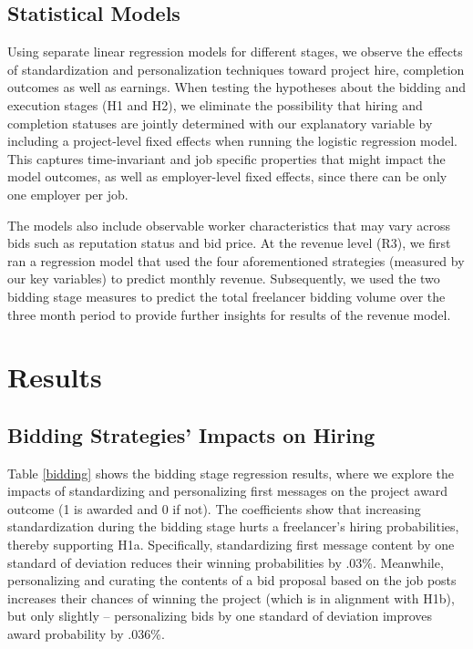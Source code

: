 

\subsection{Statistical Models }
Using separate linear regression models for different stages, we observe the effects of standardization and personalization techniques toward project hire, completion outcomes as well as earnings. When testing the hypotheses about the bidding and execution stages (H1 and H2), we eliminate the possibility that hiring and completion statuses are jointly determined with our explanatory variable by including a project-level fixed effects when running the logistic regression model. This captures time-invariant and job specific properties that might impact the model outcomes, as well as employer-level fixed effects, since there can be only one employer per job. 

The models also include observable worker characteristics that may vary across bids such as reputation status and bid price. At the revenue level (R3), we first ran a regression model that used the four aforementioned strategies {(measured by our key variables)} to predict monthly revenue. Subsequently, we used the two bidding stage measures to predict the total freelancer bidding volume over the three month period to provide further insights for results of the revenue model.

\newpage 
\section{Results}

\FloatBarrier
\subsection{{Bidding Strategies' Impacts on Hiring}}
Table \cref{bidding} shows the bidding stage regression results, where we explore the impacts of standardizing and personalizing first messages on the project award outcome (1 is awarded and 0 if not). The coefficients show that increasing standardization during the bidding stage hurts a freelancer's hiring probabilities, {thereby supporting H1a. Specifically, standardizing first message content by one standard of deviation reduces their winning probabilities by .03\%. Meanwhile, personalizing and curating the contents of a bid proposal based on the job posts increases their chances of winning the project (which is in alignment with H1b), but only slightly -- personalizing bids by one standard of deviation improves award probability by .036\%. } 

